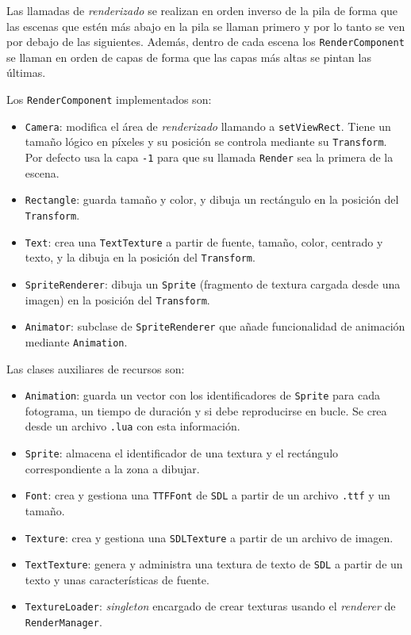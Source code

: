 \medskip

Las llamadas de \textit{renderizado} se realizan en orden inverso de la pila de forma que las escenas que estén más abajo en la pila se llaman primero y por lo tanto se ven por debajo de las siguientes. Además, dentro de cada escena los \texttt{RenderComponent} se llaman en orden de capas de forma que las capas más altas se pintan las últimas.

\medskip

Los \texttt{RenderComponent} implementados son: 

\begin{itemize}
	\item \texttt{Camera}: modifica el área de \textit{renderizado} llamando a \texttt{setViewRect}. Tiene un tamaño lógico en píxeles y su posición se controla mediante su \texttt{Transform}. Por defecto usa la capa \texttt{-1} para que su llamada \texttt{Render} sea la primera de la escena.
	\item \texttt{Rectangle}: guarda tamaño y color, y dibuja un rectángulo en la posición del \texttt{Transform}. 
	\item \texttt{Text}: crea una \texttt{TextTexture} a partir de fuente, tamaño, color, centrado y texto, y la dibuja en la posición del \texttt{Transform}.
	\item \texttt{SpriteRenderer}: dibuja un \texttt{Sprite} (fragmento de textura cargada desde una imagen) en la posición del \texttt{Transform}. 
	\item \texttt{Animator}: subclase de \texttt{SpriteRenderer} que añade funcionalidad de animación mediante \texttt{Animation}. 
\end{itemize}

Las clases auxiliares de recursos son: 

\begin{itemize}
	\item \texttt{Animation}: guarda un vector con los identificadores de \texttt{Sprite} para cada fotograma, un tiempo de duración y si debe reproducirse en bucle. Se crea desde un archivo \texttt{.lua} con esta información. 
	\item \texttt{Sprite}: almacena el identificador de una textura y el rectángulo correspondiente a la zona a dibujar. 
	\item \texttt{Font}: crea y gestiona una \texttt{TTFFont} de \texttt{SDL} a partir de un archivo \texttt{.ttf} y un tamaño. 
	\item \texttt{Texture}: crea y gestiona una \texttt{SDLTexture} a partir de un archivo de imagen. 
	\item \texttt{TextTexture}: genera y administra una textura de texto de \texttt{SDL} a partir de un texto y unas características de fuente.
	\item \texttt{TextureLoader}: \textit{singleton} encargado de crear texturas usando el \textit{renderer} de \texttt{RenderManager}.  
\end{itemize}

